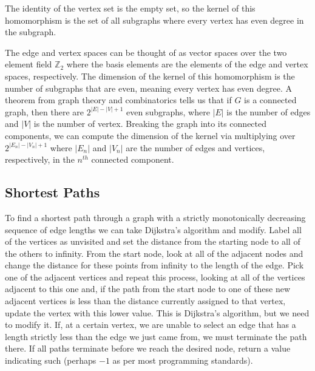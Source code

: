 \documentclass{article}
\theoremstyle{plain}
\theoremstyle{normal}
\begin{document}
            The identity of the vertex set is the empty set, so the kernel of
            this homomorphism is the set of all subgraphs where every vertex
            has even degree in the subgraph.
            \par\hfill\par
            The edge and vertex spaces can be thought of as vector spaces over
            the two element field $\mathbb{Z}_{2}$ where the basis elements are
            the elements of the edge and vertex spaces, respectively. The
            dimension of the kernel of this homomorphism is the number of
            subgraphs that are even, meaning every vertex has even degree.
            A theorem from graph theory and combinatorics tells us that if
            $G$ is a connected graph, then there are
            $2^{|E|-|V|+1}$ even subgraphs, where $|E|$ is the number of edges
            and $|V|$ is the number of vertex. Breaking the graph into
            its connected components, we can compute the dimension of the
            kernel via multiplying over $2^{|E_{n}|-|V_{n}|+1}$ where
            $|E_{n}|$ and $|V_{n}|$ are the number of edges and vertices,
            respectively, in the $n^{th}$ connected component.
        \subsection{Shortest Paths}
            To find a shortest path through a graph with a strictly
            monotonically decreasing sequence of edge lengths we can take
            Dijkstra's algorithm and modify. Label all of the vertices as
            unvisited and set the distance from the starting node to all of
            the others to infinity. From the start node, look at all of the
            adjacent nodes and change the distance for these points from
            infinity to the length of the edge. Pick one of the adjacent
            vertices and repeat this process, looking at all of the vertices
            adjacent to this one and, if the path from the start node to one of
            these new adjacent vertices is less than the distance currently
            assigned to that vertex, update the vertex with this lower value.
            This is Dijkstra's algorithm, but we need to modify it. If, at a
            certain vertex, we are unable to select an edge that has a length
            strictly less than the edge we just came from, we must terminate
            the path there. If all paths terminate before we reach the
            desired node, return a value indicating such
            (perhaps $-1$ as per most programming standards).
\end{document}
